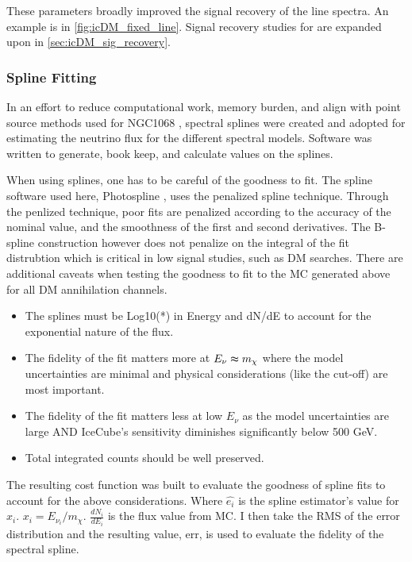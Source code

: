 These parameters broadly improved the signal recovery of the line spectra.
An example is in \cref{fig:icDM_fixed_line}.
Signal recovery studies for are expanded upon in \cref{sec:icDM_sig_recovery}.

\subsubsection{Spline Fitting}\label{sec:icDM_splines}

In an effort to reduce computational work, memory burden, and align with point source methods used for NGC1068 \cite{IC_NGC1068}, spectral splines were created and adopted for estimating the neutrino flux for the different spectral models.
Software was written to generate, book keep, and calculate values on the splines.

When using splines, one has to be careful of the goodness to fit.
The spline software used here, Photospline \cite{photospline}, uses the penalized spline technique.
Through the penlized technique, poor fits are penalized according to the accuracy of the nominal value, and the smoothness of the first and second derivatives.
The B-spline construction however does not penalize on the integral of the fit distrubtion which is critical in low signal studies, such as DM searches.
There are additional caveats when testing the goodness to fit to the MC generated above for all DM annihilation channels.
\begin{itemize}
    \item The splines must be Log10(*) in Energy and dN/dE to account for the exponential nature of the flux.
    \item The fidelity of the fit matters more at $ E_\nu \thickapprox m_\chi $ where the model uncertainties are minimal and physical considerations (like the cut-off) are most important.
    \item The fidelity of the fit matters less at low $ E_\nu $ as the model uncertainties are large AND IceCube's sensitivity diminishes significantly below 500 GeV.
    \item Total integrated counts should be well preserved.
\end{itemize}
The resulting cost function was built to evaluate the goodness of spline fits to account for the above considerations.
\erriSpline
Where $ \hat{e_i} $ is the spline estimator's value for $x_i$. $ x_i = E_{\nu_i} / m_\chi $. $ \frac{dN_i}{dE_i} $ is the flux value from MC.
I then take the RMS of the error distribution and the resulting value, err, is used to evaluate the fidelity of the spectral spline.
\MSEspline

